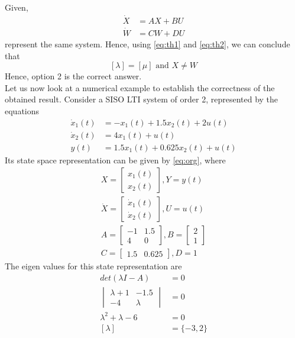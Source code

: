 \documentclass[journal,12pt,twocolumn]{IEEEtran}
\begin{document}
Given,
\begin{align}
    \dot X&=AX+BU \\
    \dot W&=CW+DU
\end{align}
represent the same system. Hence, using \eqref{eq:th1} and \eqref{eq:th2}, we can conclude that
$$[\lambda]=[\mu] \text{ and } X\neq W$$
Hence, option 2 is the correct answer.\\
Let us now look at a numerical example to establish the correctness of the obtained result. Consider a SISO LTI system of order 2, represented by the equations
\begin{align}
    \dot x_1(t)&=-x_1(t)+1.5x_2(t)+2u(t)\\
    \dot x_2(t)&=4x_1(t)+u(t)\\
    y(t)&=1.5x_1(t)+0.625x_2(t)+u(t)
\end{align}
Its state space representation can be given by \eqref{eq:org}, where
\begin{align}
    X=\begin{bmatrix}
    x_1(t)\\x_2(t)
    \end{bmatrix},Y=y(t)\\
    \dot X=\begin{bmatrix}
    \dot x_1(t)\\\dot x_2(t)
    \end{bmatrix},U=u(t)\\
    A=\begin{bmatrix}
    -1 & 1.5\\
    4 & 0
    \end{bmatrix},B=\begin{bmatrix}
    2\\
    1
    \end{bmatrix}\\
    C=\begin{bmatrix}
    1.5 & 0.625
    \end{bmatrix},D=1
\end{align}
The eigen values for this state representation are
\begin{align}
    det(\lambda I-A)&=0\\
    \begin{vmatrix}
    \lambda+1 & -1.5\\
    -4 & \lambda
    \end{vmatrix}&=0\\
    \lambda^2+\lambda-6&=0\\
    [\lambda]&=\{-3,2\}
\end{align}
\end{document}
